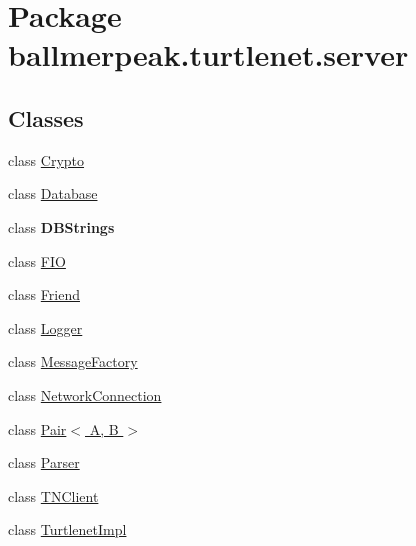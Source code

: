 \hypertarget{namespaceballmerpeak_1_1turtlenet_1_1server}{\section{Package ballmerpeak.\-turtlenet.\-server}
\label{namespaceballmerpeak_1_1turtlenet_1_1server}
}
\subsection*{Classes}
\begin{DoxyCompactItemize}
\item 
class \hyperlink{classballmerpeak_1_1turtlenet_1_1server_1_1Crypto}{Crypto}
\item 
class \hyperlink{classballmerpeak_1_1turtlenet_1_1server_1_1Database}{Database}
\item 
class {\bfseries D\-B\-Strings}
\item 
class \hyperlink{classballmerpeak_1_1turtlenet_1_1server_1_1FIO}{F\-I\-O}
\item 
class \hyperlink{classballmerpeak_1_1turtlenet_1_1server_1_1Friend}{Friend}
\item 
class \hyperlink{classballmerpeak_1_1turtlenet_1_1server_1_1Logger}{Logger}
\item 
class \hyperlink{classballmerpeak_1_1turtlenet_1_1server_1_1MessageFactory}{Message\-Factory}
\item 
class \hyperlink{classballmerpeak_1_1turtlenet_1_1server_1_1NetworkConnection}{Network\-Connection}
\item 
class \hyperlink{classballmerpeak_1_1turtlenet_1_1server_1_1Pair_3_01A_00_01B_01_4}{Pair$<$ A, B $>$}
\item 
class \hyperlink{classballmerpeak_1_1turtlenet_1_1server_1_1Parser}{Parser}
\item 
class \hyperlink{classballmerpeak_1_1turtlenet_1_1server_1_1TNClient}{T\-N\-Client}
\item 
class \hyperlink{classballmerpeak_1_1turtlenet_1_1server_1_1TurtlenetImpl}{Turtlenet\-Impl}
\end{DoxyCompactItemize}
